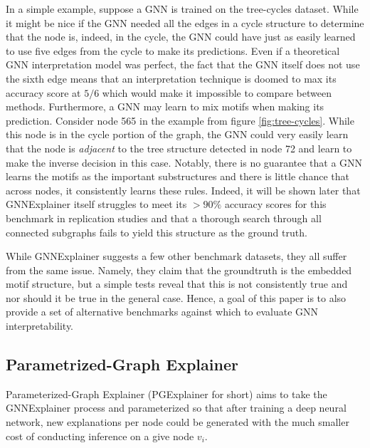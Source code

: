 In a simple example, suppose a GNN is trained on the tree-cycles dataset. While it might be nice if the GNN needed all the edges in a cycle structure to determine that the node is, indeed, in the cycle, the GNN could have just as easily learned to use five edges from the cycle to make its predictions. Even if a theoretical GNN interpretation model was perfect, the fact that the GNN itself does not use the sixth edge means that an interpretation technique is doomed to max its accuracy score at $5/6$ which would make it impossible to compare between methods. Furthermore, a GNN may learn to mix motifs when making its prediction. Consider node 565 in the example from figure \ref{fig:tree-cycles}. While this node is in the cycle portion of the graph, the GNN could very easily learn that the node is \textit{adjacent} to the tree structure detected in node 72 and learn to make the inverse decision in this case. Notably, there is no guarantee that a GNN learns the motifs as the important substructures and there is little chance that across nodes, it consistently learns these rules. Indeed, it will be shown later that GNNExplainer itself struggles to meet its $>90\%$ accuracy scores for this benchmark in replication studies \cite{yuan_explainability_2021} \cite{lin_generative_2021} and that a thorough search through all connected subgraphs fails to yield this structure as the ground truth. 

While GNNExplainer suggests a few other benchmark datasets, they all suffer from the same issue. Namely, they claim that the groundtruth is the embedded motif structure, but a simple tests reveal that this is not consistently true and nor should it be true in the general case. Hence, a goal of this paper is to also provide a set of alternative benchmarks against which to evaluate GNN interpretability.

\subsection{Parametrized-Graph Explainer}
Parameterized-Graph Explainer (PGExplainer for short) aims to take the GNNExplainer process and parameterized so that after training a deep neural network, new explanations per node could be generated with the much smaller cost of conducting inference on a give node $v_i$.

